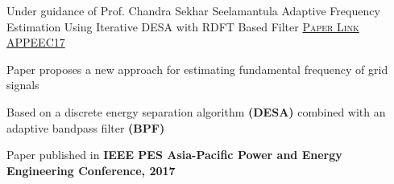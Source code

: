 \vspace{-4mm}
\begin{cventries}
  \cventry
    {Under guidance of Prof. Chandra Sekhar Seelamantula}
    {Adaptive Frequency
Estimation Using Iterative
DESA with RDFT Based
Filter}
    {\href{https://ieeexplore.ieee.org/abstract/document/8308990/?part=1}{\textsc{Paper Link}}}
    {\href{http://ieee-appeec2017.org/}{APPEEC17}}
    {
      \begin{cvitems}
        \item{Paper proposes a new approach for estimating fundamental frequency of grid signals}
        \item{Based on a discrete energy separation algorithm \textbf{(DESA)} combined with an adaptive bandpass filter \textbf{(BPF)}}
        \item {Paper published in \textbf{IEEE PES Asia-Pacific Power and Energy Engineering Conference, 2017}}
      \end{cvitems}
    }

\end{cventries}

